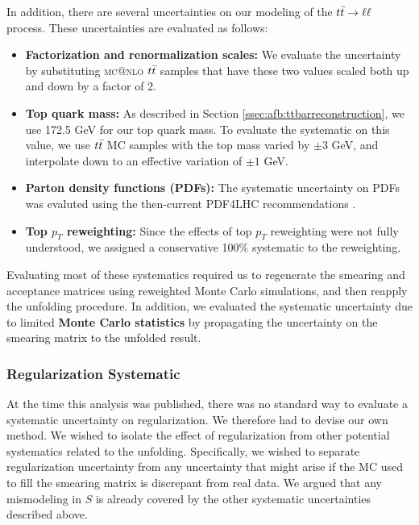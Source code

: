 In addition, there are several uncertainties on our modeling of the
$t\bar{t} \rightarrow \ell\ell$ process. These uncertainties are evaluated as follows:

\begin{itemize}
\item \textbf{Factorization and renormalization scales:} We evaluate
  the uncertainty by substituting \textsc{mc@nlo} $t\bar{t}$ samples that have
  these two values scaled both up and down by a factor of 2.
\item \textbf{Top quark mass:} As described in Section
  \ref{ssec:afb:ttbarreconstruction}, we use 172.5 GeV for our top
  quark mass. To evaluate the systematic on this value, we use
  $t\bar{t}$ MC samples with the top mass varied by $\pm 3$ GeV, and
  interpolate down to an effective variation of $\pm 1$ GeV.
\item \textbf{Parton density functions (PDFs):} The systematic
  uncertainty on PDFs was evaluted using the then-current PDF4LHC
  recommendations \cite{pdf4lhc}.
\item \textbf{Top $p_T$ reweighting:} Since the effects of top $p_T$
  reweighting were not fully understood, we assigned a conservative
  100\% systematic to the reweighting.
\end{itemize}

Evaluating most of these systematics required us to regenerate the
smearing and acceptance matrices using reweighted Monte Carlo
simulations, and then reapply the unfolding procedure. In addition, we
evaluated the systematic uncertainty due to limited \textbf{Monte
  Carlo statistics} by propagating the uncertainty on the smearing
matrix to the unfolded result.

\subsubsection*{Regularization Systematic}

At the time this analysis was published, there was no standard way to
evaluate a systematic uncertainty on regularization. We therefore had
to devise our own method. We wished to isolate the effect of
regularization from other potential systematics related to the
unfolding. Specifically, we wished to separate regularization
uncertainty from any uncertainty that might arise if the MC used to
fill the smearing matrix is discrepant from real data. We argued that
any mismodeling in $S$ is already covered by the other systematic
uncertainties described above.

